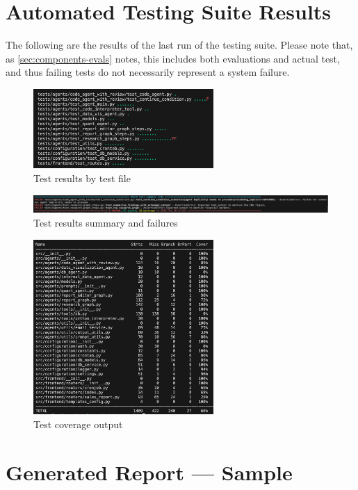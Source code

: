 \documentclass[a4paper]{report}
\begin{document}
\chapter{Automated Testing Suite Results}
\label{annex:test-results}

The following are the results of the last run of the testing suite. Please note that, as \autoref{sec:components-evals} notes, this includes both evaluations and actual test, and thus failing tests do not necessarily represent a system failure.

\begin{figure}[H]
\centering
\includegraphics[width=0.61\textwidth]{images/test-results.png}
\caption{Test results by test file}
\end{figure}

\begin{figure}[H]
\centering
\includegraphics[width=1\textwidth]{images/test-results-bottom.png}
\caption{Test results summary and failures}
\label{fig:evals-form}
\end{figure}

\begin{figure}[H]
\centering
\includegraphics[width=0.61\textwidth]{images/test-coverage.png}
\caption{Test coverage output}
\label{fig:evals-form}
\end{figure}

\chapter{Generated Report --- Sample}
\end{document}
